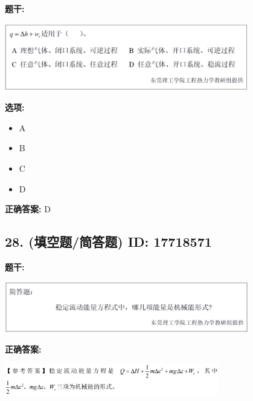 \documentclass[12pt]{article}
\begin{document}
\textbf{题干:}


\begin{center}\includegraphics[width=0.8\textwidth, height=0.25\textheight, keepaspectratio]{question_27_17718551/title_img_1.png}\end{center}

\textbf{选项:}
\begin{itemize}[leftmargin=*]
  \item A

  \item B

  \item C

  \item D

\end{itemize}

\textbf{正确答案:}
D

\vspace{0.5em}\hrulefill\vspace{1em}

\subsection*{28. (填空题/简答题) \small ID: 17718571}

\textbf{题干:}


\begin{center}\includegraphics[width=0.8\textwidth, height=0.25\textheight, keepaspectratio]{question_28_17718571/title_img_1.png}\end{center}

\textbf{正确答案:}

\begin{center}\includegraphics[width=0.7\textwidth, height=0.2\textheight, keepaspectratio]{question_28_17718571/correct_answer_1_img_1.png}\end{center}

\vspace{0.5em}\hrulefill\vspace{1em}
\end{document}

